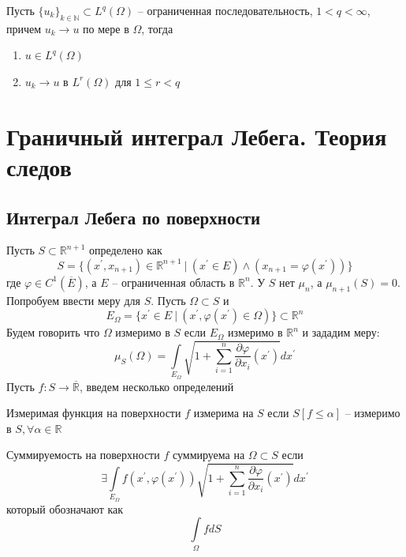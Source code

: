\documentclass[12pt,a4paper]{article}
\newcommand{\intset}[1]{\int\limits_{#1}}
\newcommand{\Real}{\mathbb{R}}
\newcommand{\Natural}{\mathbb{N}}
\begin{document}
\begin{lemma}{}{}
	Пусть $\{u_k\}_{k\in\Natural} \subset L^q (\Omega)$ -- ограниченная последовательность, $1 < q < \infty$, причем $u_k \to u$ по мере в $\Omega$, тогда
	\begin{enumerate}
		\item $u \in L^q (\Omega)$
		\item $u_k \to u$ в $L^r (\Omega)$ для $1 \leq r < q$
	\end{enumerate}
\end{lemma}

\section{Граничный интеграл Лебега. Теория следов}

\subsection{Интеграл Лебега по поверхности}

Пусть $S \subset \Real^{n+1}$ определено как
\begin{equation*}
S = \{ (x^\prime, x_{n+1}) \in \Real^{n+1} \ | \ (x^\prime \in E) \wedge (x_{n+1} = \varphi(x^\prime))\}
\end{equation*}
где $\varphi \in C^1 (\overline{E})$, а $E$ -- ограниченная область в $\Real^n$. У $S$ нет $\mu_n$, а $\mu_{n+1} (S) = 0$. Попробуем ввести меру для $S$. Пусть $\Omega \subset S$ и 
\begin{equation*}
E_\Omega = \{ x^\prime \in E \ | \ (x^\prime, \varphi(x^\prime) \in \Omega)\} \subset \Real^n
\end{equation*}
Будем говорить что $\Omega$ измеримо в $S$ если $E_\Omega$ измеримо в $\Real^n$ и зададим меру:
\begin{equation*}
\mu_S (\Omega) = \intset{E_\Omega}{\sqrt{1 + \sum\limits_{i=1}^{n}{\frac{\partial \varphi}{\partial x_i} (x^\prime)}}dx^\prime}
\end{equation*}
Пусть $f : S \to \overline{\Real}$, введем несколько определений

\begin{definition}{Измеримая функция на поверхности}{}
	$f$ измерима на $S$ если $S[f \leq \alpha]$ -- измеримо в $S, \forall \alpha \in \Real$ 
\end{definition}

\begin{definition}{Суммируемость на поверхности}{}
	$f$ суммируема на $\Omega \subset S$ если
	\begin{equation*}
	\exists \intset{E_\Omega}{f(x^\prime, \varphi(x^\prime)) \sqrt{1 + \sum\limits_{i=1}^{n}{\frac{\partial \varphi}{\partial x_i} (x^\prime)}} dx^\prime}
	\end{equation*}
	который обозначают как 
	\begin{equation*}
	\intset{\Omega}{fdS}
	\end{equation*}
\end{definition}
\end{document}

